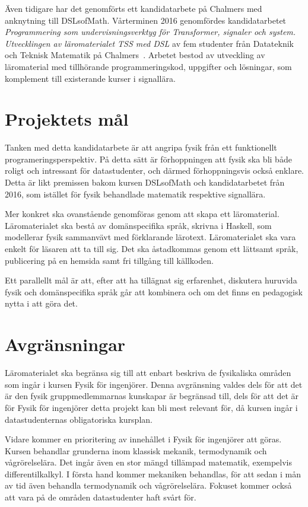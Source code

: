 \begin{draft}
Även tidigare har det genomförts ett kandidatarbete på Chalmers med anknytning till DSLsofMath.
Vårterminen 2016 genomfördes kandidatarbetet \textit{Programmering som
undervisningsverktyg för Transformer, signaler och system. Utvecklingen av
läromaterialet TSS med DSL} av fem studenter från Datateknik och Teknisk
Matematik på Chalmers~\cite{kandidat2016}. Arbetet bestod av utveckling av läromaterial med
tillhörande programmeringskod, uppgifter och lösningar, som komplement till
existerande kurser i signallära.

\section{Projektets mål}

Tanken med detta kandidatarbete är att angripa fysik från ett funktionellt
programeringsperspektiv. På detta sätt är förhoppningen att fysik ska bli både
roligt och intressant för datastudenter, och därmed förhoppningsvis också
enklare. Detta är likt premissen bakom kursen DSLsofMath och kandidatarbetet
från 2016, som istället för fysik behandlade matematik respektive signallära.

Mer konkret ska ovanstående genomföras genom att skapa ett läromaterial.
Läromaterialet ska bestå av 
domänspecifika språk, skrivna
i Haskell, som
modellerar fysik sammanvävt med förklarande lärotext. Läromaterialet ska vara
enkelt för läsaren att ta till sig. Det ska åstadkommas genom ett lättsamt
språk, publicering på en hemsida samt fri tillgång till källkoden.

Ett parallellt mål är att, efter att ha tillägnat sig erfarenhet, diskutera
huruvida fysik och domänspecifika språk går att kombinera och om det finns en
pedagogisk nytta i att göra det.

\section{Avgränsningar}\label{sec:avgransningar}

Läromaterialet ska begränsa sig till att enbart beskriva de fysikaliska områden
som ingår i kursen Fysik för ingenjörer. Denna avgränsning valdes dels för att
det är den fysik gruppmedlemmarnas kunskapar är begränsad till, dels för att
det är för Fysik för ingenjörer detta projekt kan bli mest relevant för, då
kursen ingår i datastudenternas obligatoriska kursplan.

Vidare kommer en prioritering av innehållet i Fysik för ingenjörer att göras.
Kursen behandlar grunderna inom klassisk mekanik, termodynamik och
vågrörelselära. Det ingår även en stor mängd tillämpad matematik, exempelvis
differentilkalkyl. I första hand kommer mekaniken behandlas, för att sedan i mån
av tid även behandla termodynamik och vågrörelselära. Fokuset kommer också att
vara på de områden datastudenter haft svårt för.


\end{draft}
